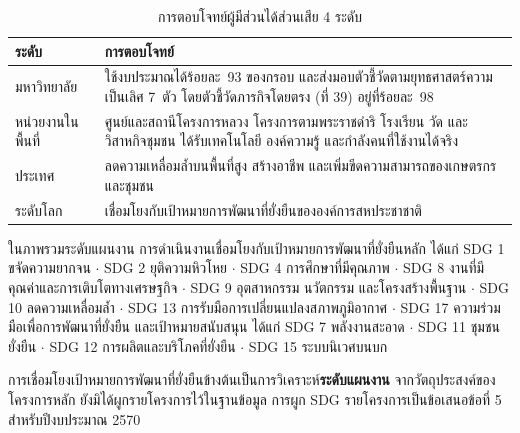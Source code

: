 \begin{table}[H]
\centering
\caption{การตอบโจทย์ผู้มีส่วนได้ส่วนเสีย 4 ระดับ}
\small
\begin{tabular}{L{3.0cm}L{10.7cm}}
\toprule
{}
\textbf{ระดับ} & \textbf{การตอบโจทย์}\\
\midrule
มหาวิทยาลัย & ใช้งบประมาณได้ร้อยละ~93 ของกรอบ และส่งมอบตัวชี้วัดตามยุทธศาสตร์ความเป็นเลิศ 7~ตัว โดยตัวชี้วัดภารกิจโดยตรง (ที่ 39) อยู่ที่ร้อยละ~98\\
หน่วยงานในพื้นที่ & ศูนย์และสถานีโครงการหลวง โครงการตามพระราชดำริ โรงเรียน วัด และวิสาหกิจชุมชน ได้รับเทคโนโลยี องค์ความรู้ และกำลังคนที่ใช้งานได้จริง\\
ประเทศ & ลดความเหลื่อมล้ำบนพื้นที่สูง สร้างอาชีพ และเพิ่มขีดความสามารถของเกษตรกรและชุมชน\\
ระดับโลก & เชื่อมโยงกับเป้าหมายการพัฒนาที่ยั่งยืนขององค์การสหประชาชาติ\\
\bottomrule
\end{tabular}
\end{table}

ในภาพรวมระดับแผนงาน การดำเนินงานเชื่อมโยงกับเป้าหมายการพัฒนาที่ยั่งยืนหลัก ได้แก่
SDG 1 ขจัดความยากจน $\cdot$ SDG 2 ยุติความหิวโหย $\cdot$ SDG 4 การศึกษาที่มีคุณภาพ $\cdot$
SDG 8 งานที่มีคุณค่าและการเติบโตทางเศรษฐกิจ $\cdot$ SDG 9 อุตสาหกรรม นวัตกรรม และโครงสร้างพื้นฐาน $\cdot$
SDG 10 ลดความเหลื่อมล้ำ $\cdot$ SDG 13 การรับมือการเปลี่ยนแปลงสภาพภูมิอากาศ $\cdot$
SDG 17 ความร่วมมือเพื่อการพัฒนาที่ยั่งยืน
และเป้าหมายสนับสนุน ได้แก่ SDG 7 พลังงานสะอาด $\cdot$ SDG 11 ชุมชนยั่งยืน $\cdot$
SDG 12 การผลิตและบริโภคที่ยั่งยืน $\cdot$ SDG 15 ระบบนิเวศบนบก

\begin{infobox}
การเชื่อมโยงเป้าหมายการพัฒนาที่ยั่งยืนข้างต้นเป็นการวิเคราะห์\textbf{ระดับแผนงาน}
จากวัตถุประสงค์ของโครงการหลัก ยังมิได้ผูกรายโครงการไว้ในฐานข้อมูล
การผูก SDG รายโครงการเป็นข้อเสนอข้อที่ 5 สำหรับปีงบประมาณ 2570
\end{infobox}
